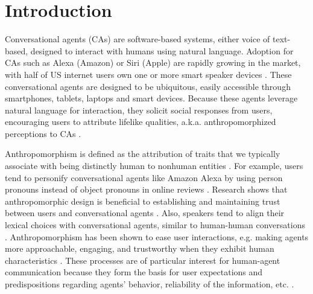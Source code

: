 \documentclass[sigconf,screen,review, anonymous]{acmart}
\begin{document}



\maketitle

\section{Introduction}

Conversational agents (CAs) are software-based systems, either voice of text-based, designed to interact with humans using natural language. Adoption for CAs such as Alexa (Amazon) or Siri (Apple) are rapidly growing in the market, with half of US internet users own one or more smart speaker devices \cite{2022comscore}. These conversational agents are designed to be ubiquitous, easily accessible through smartphones, tablets, laptops and smart devices. Because these agents leverage natural language for interaction, they solicit social responses from users, encouraging users to attribute lifelike qualities, a.k.a. anthropomorphized perceptions to CAs \cite{eyssel2012if}.

Anthropomorphism is defined as the attribution of traits that we typically associate with being distinctly human to nonhuman entities \cite{waytz2010sees}. For example, users tend to personify conversational agents like Amazon Alexa by using person pronouns instead of object pronouns in online reviews \cite{purington2017alexa}.  Research shows that anthropomorphic design is beneficial to establishing and maintaining trust between users and conversational agents \cite{seeger2021chatbots}. Also, speakers tend to align their lexical choices with conversational agents, similar to human-human conversations \cite{cowan2015does}. Anthropomorphism has been shown to ease user interactions, e.g. making agents more approachable, engaging, and trustworthy when they exhibit human characteristics \cite{qiu2009evaluating}. These processes are of particular interest for human-agent communication because they form the basis for user expectations and predispositions regarding agents' behavior, reliability of the information, etc. \cite{kuzminykh2020genie}.
\end{document}
